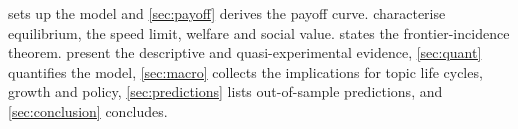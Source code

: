  sets up the model and \cref{sec:payoff} derives the payoff
curve.  characterise equilibrium, the speed
limit, welfare and social value.  states the frontier-incidence
theorem.  present the descriptive and
quasi-experimental evidence, \cref{sec:quant} quantifies the model,
\cref{sec:macro} collects the implications for topic life cycles, growth and
policy, \cref{sec:predictions} lists out-of-sample predictions, and
\cref{sec:conclusion} concludes.
